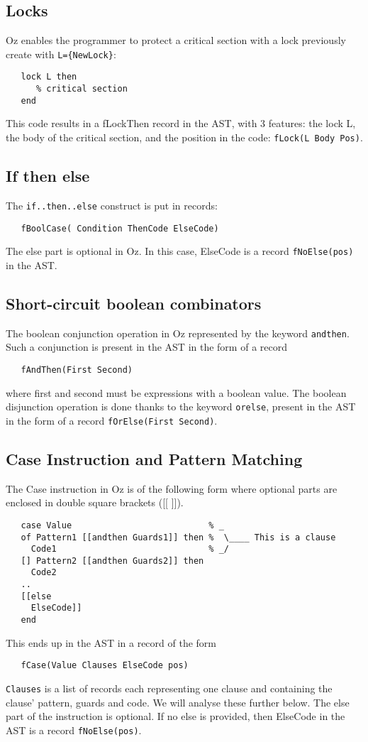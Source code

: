 \documentclass[a4paper]{memoir}
\begin{document}
\subsection{Locks}\label{sec:input:locks}
Oz enables the programmer to protect a critical section with a lock previously create with \lstinline!L={NewLock}!:
\begin{lstlisting}
   lock L then
      % critical section
   end
\end{lstlisting}

This code results in a fLockThen record in the AST, with 3 features: the lock L,
the body of the critical section, and the position in the code:
\lstinline!fLock(L Body Pos)!.

\subsection{If then else}
The \lstinline!if..then..else! construct is put in records:
\begin{lstlisting}
   fBoolCase( Condition ThenCode ElseCode)
\end{lstlisting}
The else part is optional in Oz. In this case, ElseCode is a record \lstinline!fNoElse(pos)! in the AST.

\subsection{Short-circuit boolean combinators}\label{sec:input:booleancombinations}
The boolean conjunction operation in Oz represented by the keyword \lstinline!andthen!. Such a conjunction is present in the AST in the form of a record 
\begin{lstlisting}
   fAndThen(First Second)
\end{lstlisting}
where first and second must be expressions with a boolean value.
The boolean disjunction operation is done thanks to the keyword \lstinline!orelse!, present in the AST in the form of a record \lstinline!fOrElse(First Second)!.

\subsection{Case Instruction and Pattern Matching}\label{sec:input:patternmatching}
The Case instruction in Oz is of the following form where optional parts are enclosed in double square brackets ([[ ]]).
\begin{lstlisting}
   case Value                           % _
   of Pattern1 [[andthen Guards1]] then %  \____ This is a clause
     Code1                              % _/
   [] Pattern2 [[andthen Guards2]] then
     Code2
   ..
   [[else
     ElseCode]]
   end
\end{lstlisting}
This ends up in the AST in a record of the form 
\begin{lstlisting}
   fCase(Value Clauses ElseCode pos)
\end{lstlisting}
\lstinline!Clauses! is a list of records each representing one clause and containing the clause' pattern, guards and code. We will analyse these further below.
The else part of the instruction is optional. If no else is provided, then ElseCode in the AST is a record \lstinline!fNoElse(pos)!.
\end{document}
